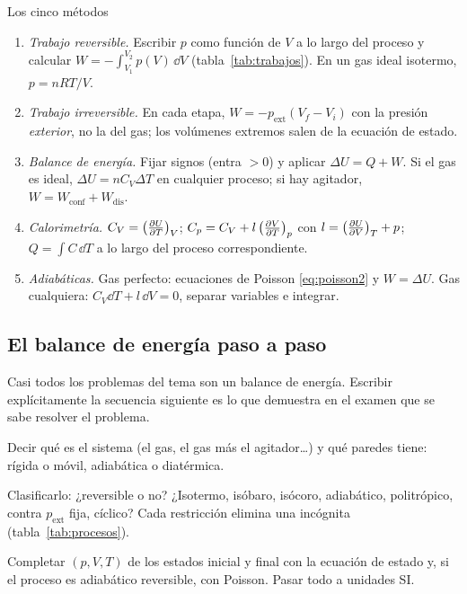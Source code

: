 \begin{recuadro}{Los cinco métodos}
\begin{enumerate}[label=\textbf{\color{navy}M\arabic*.},leftmargin=2.2em,itemsep=4pt]
\item \emph{Trabajo reversible.} Escribir $p$ como función de $V$ a lo largo del proceso y calcular
  $W=-\int_{V_1}^{V_2}p(V)\,\dd V$ (tabla~\ref{tab:trabajos}). En un gas ideal isotermo, $p=nRT/V$.
\item \emph{Trabajo irreversible.} En cada etapa, $W=-p_{\mathrm{ext}}(V_f-V_i)$ con la presión
  \emph{exterior}, no la del gas; los volúmenes extremos salen de la ecuación de estado.
\item \emph{Balance de energía.} Fijar signos (entra $>0$) y aplicar $\Delta U=Q+W$. Si el gas es ideal,
  $\Delta U=nC_V\Delta T$ en cualquier proceso; si hay agitador, $W=W_{\mathrm{conf}}+W_{\mathrm{dis}}$.
\item \emph{Calorimetría.} $C_V=\bigl(\tfrac{\partial U}{\partial T}\bigr)_{V}$; $C_p=C_V+l\,\bigl(\tfrac{\partial V}{\partial T}\bigr)_{p}$ con $l=\bigl(\tfrac{\partial U}{\partial V}\bigr)_{T}+p$; $Q=\int C\,\dd T$
  a lo largo del proceso correspondiente.
\item \emph{Adiabáticas.} Gas perfecto: ecuaciones de Poisson \eqref{eq:poisson2} y $W=\Delta U$. Gas
  cualquiera: $C_V\dd T+l\,\dd V=0$, separar variables e integrar.
\end{enumerate}
\end{recuadro}

\subsection{El balance de energía paso a paso}\label{sec:receta}

Casi todos los problemas del tema son un balance de energía. Escribir explícitamente la secuencia
siguiente es lo que demuestra en el examen que se sabe resolver el problema.

 Decir qué es el sistema (el gas, el gas más el agitador\dots) y qué
paredes tiene: rígida o móvil, adiabática o diatérmica.

 Clasificarlo: ¿reversible o no? ¿Isotermo, isóbaro, isócoro, adiabático,
politrópico, contra $p_{\mathrm{ext}}$ fija, cíclico? Cada restricción elimina una incógnita
(tabla~\ref{tab:procesos}).

 Completar $(p,V,T)$ de los estados inicial y final con la ecuación de estado y,
si el proceso es adiabático reversible, con Poisson. Pasar todo a unidades SI.

